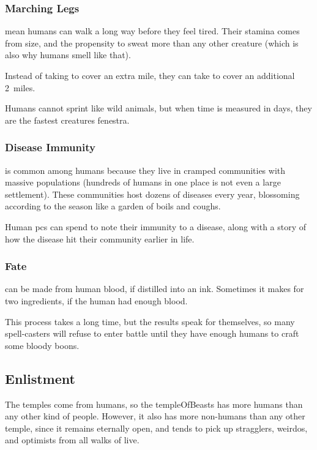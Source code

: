 \subsubsection[Marching Legs: every \glsentrytext{ep} spent to march adds 2 miles]{Marching Legs}
\label{humanInheritance}
mean humans can walk a long way before they feel tired.
Their stamina comes from size, and the propensity to sweat more than any other creature (which is also why humans smell like that).

Instead of taking  to cover an extra mile, they can take  to cover an additional 2~miles.

Humans cannot sprint like wild animals, but when time is measured in days, they are the fastest creatures \gls{fenestra}.

\subsubsection{Disease Immunity}
is common among humans because they live in cramped communities with massive populations (hundreds of humans in one place is not even a large settlement).
These communities host dozens of diseases every year, blossoming according to the season like a garden of boils and coughs.

Human \glspl{pc} can spend  to note their immunity to a disease, along with a story of how the disease hit their community earlier in life.

\subsubsection{Fate }
can be made from human blood, if distilled into an ink.
Sometimes it makes for two \glspl{ingredient}, if the human had enough blood.

This process takes a long time, but the results speak for themselves, so many spell-casters will refuse to enter battle until they have enough humans to craft some bloody \glspl{boon}.

\subsection{Enlistment}

The \glspl{temple} come from humans, so the \gls{templeOfBeasts} has more humans than any other kind of people.
However, it also has more non-humans than any other \gls{temple}, since it remains eternally open, and tends to pick up stragglers, weirdos, and optimists from all walks of live.

